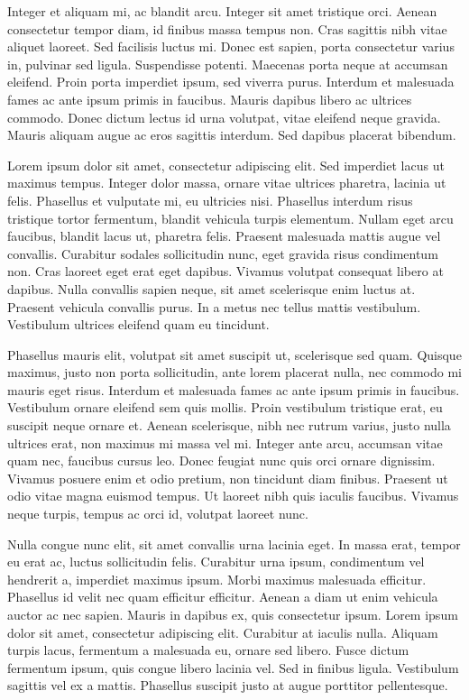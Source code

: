 \documentclass[
  12pt,
  a4paper,
  oneside]{book}
\begin{document}
Integer et aliquam mi, ac blandit arcu. Integer sit amet tristique orci. Aenean consectetur tempor diam, id finibus massa tempus non. Cras sagittis nibh vitae aliquet laoreet. Sed facilisis luctus mi. Donec est sapien, porta consectetur varius in, pulvinar sed ligula. Suspendisse potenti. Maecenas porta neque at accumsan eleifend. Proin porta imperdiet ipsum, sed viverra purus. Interdum et malesuada fames ac ante ipsum primis in faucibus. Mauris dapibus libero ac ultrices commodo. Donec dictum lectus id urna volutpat, vitae eleifend neque gravida. Mauris aliquam augue ac eros sagittis interdum. Sed dapibus placerat bibendum.

Lorem ipsum dolor sit amet, consectetur adipiscing elit. Sed imperdiet lacus ut maximus tempus. Integer dolor massa, ornare vitae ultrices pharetra, lacinia ut felis. Phasellus et vulputate mi, eu ultricies nisi. Phasellus interdum risus tristique tortor fermentum, blandit vehicula turpis elementum. Nullam eget arcu faucibus, blandit lacus ut, pharetra felis. Praesent malesuada mattis augue vel convallis. Curabitur sodales sollicitudin nunc, eget gravida risus condimentum non. Cras laoreet eget erat eget dapibus. Vivamus volutpat consequat libero at dapibus. Nulla convallis sapien neque, sit amet scelerisque enim luctus at. Praesent vehicula convallis purus. In a metus nec tellus mattis vestibulum. Vestibulum ultrices eleifend quam eu tincidunt.

Phasellus mauris elit, volutpat sit amet suscipit ut, scelerisque sed quam. Quisque maximus, justo non porta sollicitudin, ante lorem placerat nulla, nec commodo mi mauris eget risus. Interdum et malesuada fames ac ante ipsum primis in faucibus. Vestibulum ornare eleifend sem quis mollis. Proin vestibulum tristique erat, eu suscipit neque ornare et. Aenean scelerisque, nibh nec rutrum varius, justo nulla ultrices erat, non maximus mi massa vel mi. Integer ante arcu, accumsan vitae quam nec, faucibus cursus leo. Donec feugiat nunc quis orci ornare dignissim. Vivamus posuere enim et odio pretium, non tincidunt diam finibus. Praesent ut odio vitae magna euismod tempus. Ut laoreet nibh quis iaculis faucibus. Vivamus neque turpis, tempus ac orci id, volutpat laoreet nunc.

Nulla congue nunc elit, sit amet convallis urna lacinia eget. In massa erat, tempor eu erat ac, luctus sollicitudin felis. Curabitur urna ipsum, condimentum vel hendrerit a, imperdiet maximus ipsum. Morbi maximus malesuada efficitur. Phasellus id velit nec quam efficitur efficitur. Aenean a diam ut enim vehicula auctor ac nec sapien. Mauris in dapibus ex, quis consectetur ipsum. Lorem ipsum dolor sit amet, consectetur adipiscing elit. Curabitur at iaculis nulla. Aliquam turpis lacus, fermentum a malesuada eu, ornare sed libero. Fusce dictum fermentum ipsum, quis congue libero lacinia vel. Sed in finibus ligula. Vestibulum sagittis vel ex a mattis. Phasellus suscipit justo at augue porttitor pellentesque.
\end{document}
